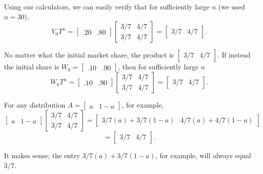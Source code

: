 Using our calculators, we can easily verify that for sufficiently large \(n\) (we used \(n = 30\)),
\[
    V_0T^n=
    \begin{bmatrix}
        .20 & .80
    \end{bmatrix}
    \begin{bmatrix}
        3/7 & 4/7 \\
        3/7 & 4/7
    \end{bmatrix} = \begin{bmatrix}
        3/7 & 4/7
    \end{bmatrix}.
\]

No matter what the initial market share, the product is \(\begin{bmatrix}
    3/7 & 4/7
\end{bmatrix}\).
If instead the initial share is \(W_0=\begin{bmatrix}
    .10 & .90
\end{bmatrix}\), then for sufficiently large \(n\)
\[
    W_0T^n=
    \begin{bmatrix}
        .10 & .90
    \end{bmatrix}
    \begin{bmatrix}
        3/7 & 4/7 \\
        3/7 & 4/7
    \end{bmatrix} = \begin{bmatrix}
        3/7 & 4/7
    \end{bmatrix}.
\]

For any distribution \(A = \begin{bmatrix}
    a & 1-a
\end{bmatrix}\), for example,
\[
    \begin{bmatrix}
        a & 1-a
    \end{bmatrix}
    \begin{bmatrix}
        3/7 & 4/7 \\
        3/7 & 4/7
    \end{bmatrix} = \begin{bmatrix}
        3/7(a) + 3/7(1-a) & 4/7(a) + 4/7(1-a)
    \end{bmatrix}
\]
\[
    = \begin{bmatrix}
        3/7 & 4/7
    \end{bmatrix}.
\]

It makes sense; the entry \(3/7(a) + 3/7(1-a)\), for example, will always equal \(3/7\).


